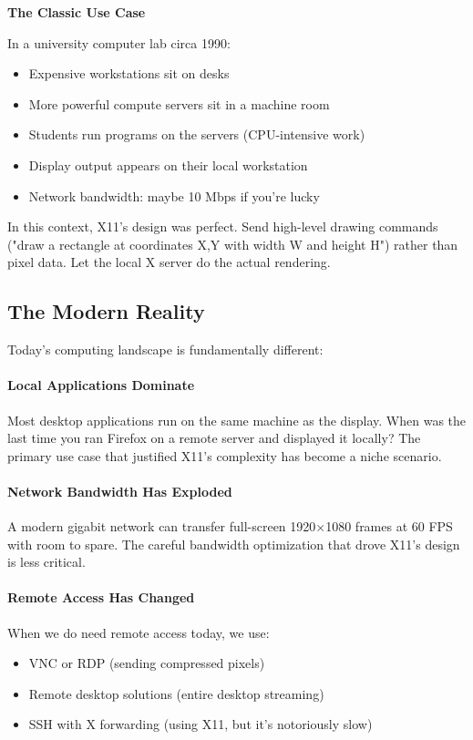 \begin{examplebox}
\textbf{The Classic Use Case}

In a university computer lab circa 1990:
\begin{itemize}
    \item Expensive workstations sit on desks
    \item More powerful compute servers sit in a machine room
    \item Students run programs on the servers (CPU-intensive work)
    \item Display output appears on their local workstation
    \item Network bandwidth: maybe 10 Mbps if you're lucky
\end{itemize}

In this context, X11's design was perfect. Send high-level drawing commands ("draw a rectangle at coordinates X,Y with width W and height H") rather than pixel data. Let the local X server do the actual rendering.
\end{examplebox}

\subsection{The Modern Reality}

Today's computing landscape is fundamentally different:

\paragraph{Local Applications Dominate}
Most desktop applications run on the same machine as the display. When was the last time you ran Firefox on a remote server and displayed it locally? The primary use case that justified X11's complexity has become a niche scenario.

\paragraph{Network Bandwidth Has Exploded}
A modern gigabit network can transfer full-screen 1920×1080 frames at 60 FPS with room to spare. The careful bandwidth optimization that drove X11's design is less critical.

\paragraph{Remote Access Has Changed}
When we do need remote access today, we use:
\begin{itemize}
    \item VNC or RDP (sending compressed pixels)
    \item Remote desktop solutions (entire desktop streaming)
    \item SSH with X forwarding (using X11, but it's notoriously slow)
\end{itemize}

